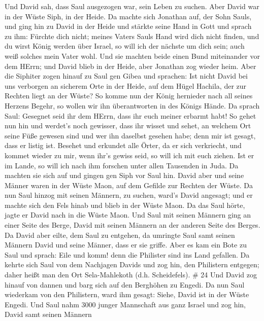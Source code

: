  Und David sah, dass Saul ausgezogen war, sein Leben zu
suchen. Aber David war in der Wüste Siph, in der Heide.  Da
machte sich Jonathan auf, der Sohn Sauls, und ging hin zu David in der
Heide und stärkte seine Hand in Gott  und sprach zu ihm:
Fürchte dich nicht; meines Vaters Sauls Hand wird dich nicht finden, und
du wirst König werden über Israel, so will ich der nächste um dich sein;
auch weiß solches mein Vater wohl.  Und sie machten beide
einen Bund miteinander vor dem HErrn; und David blieb in der Heide, aber
Jonathan zog wieder heim.  Aber die Siphiter zogen hinauf
zu Saul gen Gibea und sprachen: Ist nicht David bei uns verborgen an
sicherem Orte in der Heide, auf dem Hügel Hachila, der zur Rechten liegt
an der Wüste?  So komme nun der König hernieder nach all
seines Herzens Begehr, so wollen wir ihn überantworten in des Königs
Hände.  Da sprach Saul: Gesegnet seid ihr dem HErrn, dass
ihr euch meiner erbarmt habt!  So gehet nun hin und
werdet's noch gewisser, dass ihr wisset und sehet, an welchem Ort seine
Füße gewesen sind und wer ihn daselbst gesehen habe; denn mir ist
gesagt, dass er listig ist.  Besehet und erkundet alle
Örter, da er sich verkriecht, und kommet wieder zu mir, wenn ihr's
gewiss seid, so will ich mit euch ziehen. Ist er im Lande, so will ich
nach ihm forschen unter allen Tausenden in Juda.  Da
machten sie sich auf und gingen gen Siph vor Saul hin. David aber und
seine Männer waren in der Wüste Maon, auf dem Gefilde zur Rechten der
Wüste.  Da nun Saul hinzog mit seinen Männern, zu suchen,
ward's David angesagt; und er machte sich den Fels hinab und blieb in
der Wüste Maon. Da das Saul hörte, jagte er David nach in die Wüste
Maon.  Und Saul mit seinen Männern ging an einer Seite des
Berge, David mit seinen Männern an der anderen Seite des Berges. Da
David aber eilte, dem Saul zu entgehen, da umringte Saul samt seinen
Männern David und seine Männer, dass er sie griffe.  Aber
es kam ein Bote zu Saul und sprach: Eile und komm! denn die Philister
sind ins Land gefallen.  Da kehrte sich Saul von dem
Nachjagen Davids und zog hin, den Philistern entgegen; daher heißt man
den Ort Sela-Mahlekoth (d.h. Scheidefels). \# 24  Und David
zog hinauf von dannen und barg sich auf den Berghöhen zu Engedi.
 Da nun Saul wiederkam von den Philistern, ward ihm gesagt:
Siehe, David ist in der Wüste Engedi.  Und Saul nahm 3000
junger Mannschaft aus ganz Israel und zog hin, David samt seinen Männern
